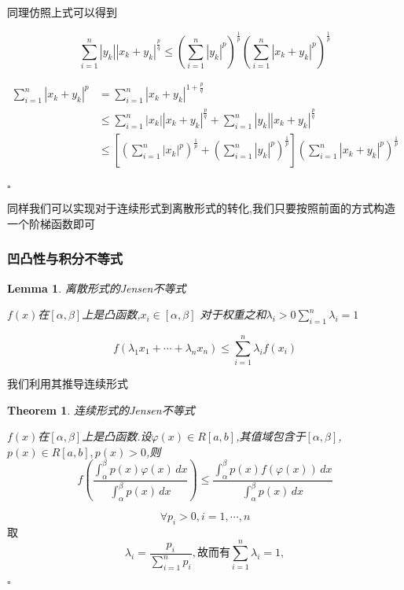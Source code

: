 \documentclass[11pt,hyperref,a4paper,UTF8]{ctexart}
\newtheorem{theorem}{Theorem}[subsection]
\newtheorem{lemma}{Lemma}[subsection]
\newenvironment{cproof}{%
\heiti{证明}\kaishu
}{%
  \hfill $\square$
  \par\bigskip
}
\newcommand{\parameter}[1]{\left(#1\right)}
\newcommand{\bracket}[1]{\left[#1\right]}
\newcommand{\abs}[1]{\left|#1\right|}
\begin{document}
\begin{CJK}{UTF8}{gkai}
\begin{cproof}
同理仿照上式可以得到

\[\sum_{i = 1}^{n} \abs{y_k}\abs{x_k + y_k}^{\frac{p}{q}} \leq \parameter{\sum_{i = 1}^{n} \abs{y_k}^p}^{\frac{1}{p}}
\parameter{\sum_{i = 1}^{n} \abs{x_k + y_k}^p}^{\frac{1}{p}}\]


\[
\begin{aligned}
  \sum_{i = 1}^{n}\abs{x_k + y_k}^p &= \sum_{i = 1}^{n}\abs{x_k + y_k}^{1 + \frac{p}{q}} \\
  &\leq \sum_{i = 1}^{n} \abs{x_k}\abs{x_k + y_k}^{\frac{p}{q}}+\sum_{i = 1}^{n}\abs{y_k}\abs{x_k + y_k}^{\frac{p}{q}}\\
  &\leq \bracket{\parameter{\sum_{i = 1}^{n} \abs{x_k}^p}^{\frac{1}{p}} + \parameter{\sum_{i = 1}^{n} \abs{y_k}^p}^{\frac{1}{p}}} \parameter{\sum_{i = 1}^{n} \abs{x_k + y_k}^p}^{\frac{1}{p}}\\
\end{aligned}  
  \]

\end{cproof}

同样我们可以实现对于连续形式到离散形式的转化,我们只要按照前面的方式构造一个阶梯函数即可

\subsubsection{凹凸性与积分不等式}

\begin{lemma}
  离散形式的Jensen不等式

  $f(x)$在$[\alpha,\beta]$上是凸函数,$x_i \in[\alpha,\beta]$
  对于权重之和$\lambda_i > 0 \sum_{i = 1}^{n}\lambda_i = 1$

  \[f\parameter{\lambda_1 x_1 + \cdots + \lambda_n x_n} \leq\sum_{i = 1}^{n}\lambda_i f(x_i)\]
\end{lemma}

我们利用其推导连续形式
\begin{theorem}
  连续形式的Jensen不等式

  $f(x)$在$[\alpha,\beta]$上是凸函数.设$\varphi(x) \in R[a,b]$,其值域包含于$[\alpha,\beta]$,$p(x)\in R[a,b],p(x) > 0$,则
  \[f\parameter{\dfrac{\int_{\alpha}^{\beta} p(x) \varphi(x)\,dx}{\int_{\alpha}^{\beta} p(x) \, dx}} \leq \dfrac{\int_{\alpha}^{\beta} p(x)f(\varphi(x)) \, dx }{\int_{\alpha}^{\beta}p(x) \,dx}\]
\end{theorem}
\begin{cproof}
\[\forall p_i > 0, i = 1, \cdots ,n\]
取\[\lambda_i = \dfrac{p_i}{\sum_{i =1 }^{n} p_i},\text{故而有}\sum_{i = 1}^{n}\lambda_i = 1,\]


\end{cproof}
\end{CJK}
\end{document}
